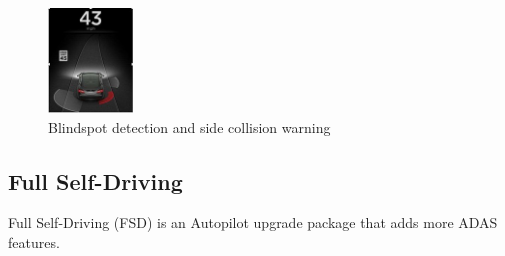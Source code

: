 \documentclass[letterpaper, 10 pt, conference]{ieeeconf}  %
\begin{document}
\begin{enumerate}
\begin{figure}[hbt!]
\centering
\includegraphics[width=0.2\textwidth]{gfx/Blindspot.jpg}
\caption{Blindspot detection and side collision warning}
\end{figure}

\end{enumerate}



\subsection{Full Self-Driving}

Full Self-Driving (FSD) is an Autopilot upgrade package that adds more ADAS features\cite{wiki_autopilot}. 
\end{document}
